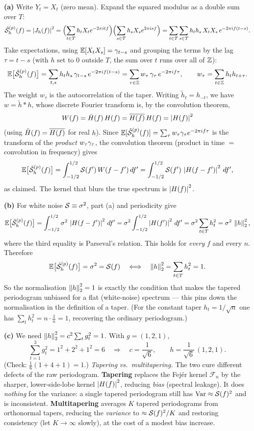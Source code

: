 \documentclass[11pt]{article}
\newcommand{\Fej}{\mathcal{F}}
\begin{document}
\textbf{(a)} Write $Y_t=X_t$ (zero mean). Expand the squared modulus as a double sum over $T$:
\[
\hat{\mathcal{S}}^{(p)}_h(f)=\left\lvert J_h(f) \right\rvert^2
=\Bigl(\sum_{t\in T}h_tX_t e^{-2\pi itf}\Bigr)\Bigl(\sum_{s\in T}h_sX_s e^{2\pi isf}\Bigr)
=\sum_{t\in T}\sum_{s\in T}h_th_s\,X_tX_s\,e^{-2\pi if(t-s)} .
\]
Take expectations, using $\mathbb{E}[X_tX_s]=\gamma_{t-s}$ and grouping the terms by the lag $\tau=t-s$ (with $h$ set to $0$ outside $T$, the sum over $t$ runs over all of $\mathbb{Z}$):
\[
\mathbb{E}\bigl[\hat{\mathcal{S}}^{(p)}_h(f)\bigr]
=\sum_{t,s}h_th_s\,\gamma_{t-s}\,e^{-2\pi if(t-s)}
=\sum_{\tau\in\mathbb{Z}} w_\tau\,\gamma_\tau\,e^{-2\pi if\tau},
\qquad
w_\tau=\sum_{t\in\mathbb{Z}}h_t h_{t+\tau} .
\]
The weight $w_\tau$ is the autocorrelation of the taper. Writing $\tilde h_t=h_{-t}$, we have $w=\tilde h * h$, whose discrete Fourier transform is, by the convolution theorem,
\[
W(f)=\tilde H(f)\,H(f)=\overline{H(f)}\,H(f)=\left\lvert H(f) \right\rvert^2
\]
(using $\tilde H(f)=\overline{H(f)}$ for real $h$). Since $\mathbb{E}[\hat{\mathcal{S}}^{(p)}_h(f)]=\sum_\tau w_\tau\gamma_\tau e^{-2\pi if\tau}$ is the transform of the \emph{product} $w_\tau\gamma_\tau$, the convolution theorem (product in time $=$ convolution in frequency) gives
\[
\mathbb{E}\bigl[\hat{\mathcal{S}}^{(p)}_h(f)\bigr]
=\int_{-1/2}^{1/2}\mathcal{S}(f')\,W(f-f')\,df'
=\int_{-1/2}^{1/2}\mathcal{S}(f')\,\left\lvert H(f-f') \right\rvert^2\,df' ,
\]
as claimed. The kernel that blurs the true spectrum is $\left\lvert H(f) \right\rvert^2$.

\textbf{(b)} For white noise $\mathcal{S}\equiv\sigma^2$, part (a) and periodicity give
\[
\mathbb{E}\bigl[\hat{\mathcal{S}}^{(p)}_h(f)\bigr]
=\int_{-1/2}^{1/2}\sigma^2\,\left\lvert H(f-f') \right\rvert^2\,df'
=\sigma^2\int_{-1/2}^{1/2}\left\lvert H(f') \right\rvert^2\,df'
=\sigma^2\sum_{t\in T}h_t^2=\sigma^2\,\left\lVert h \right\rVert_2^2 ,
\]
where the third equality is Parseval's relation. This holds for \emph{every} $f$ and every $n$. Therefore
\[
\mathbb{E}\bigl[\hat{\mathcal{S}}^{(p)}_h(f)\bigr]=\sigma^2=\mathcal{S}(f)
\quad\Longleftrightarrow\quad
\left\lVert h \right\rVert_2^2=\sum_{t\in T}h_t^2=1 .
\]
So the normalisation $\left\lVert h \right\rVert_2^2=1$ is exactly the condition that makes the tapered periodogram unbiased for a flat (white-noise) spectrum --- this pins down the normalisation in the definition of a taper. (For the constant taper $h_t=1/\sqrt n$ one has $\sum_t h_t^2=n\cdot\tfrac1n=1$, recovering the ordinary periodogram.)

\textbf{(c)} We need $\left\lVert h \right\rVert_2^2=c^2\sum_t g_t^2=1$. With $g=(1,2,1)$,
\[
\sum_{t=1}^{3}g_t^2=1^2+2^2+1^2=6
\quad\Longrightarrow\quad
c=\frac{1}{\sqrt6},\qquad
h=\frac{1}{\sqrt6}\,(1,2,1) .
\]
(Check: $\tfrac16(1+4+1)=1$.) \emph{Tapering vs.\ multitapering.} The two cure different defects of the raw periodogram. \textbf{Tapering} replaces the Fej\'er kernel $\Fej_n$ by the sharper, lower-side-lobe kernel $\left\lvert H(f) \right\rvert^2$, reducing \emph{bias} (spectral leakage). It does \emph{nothing} for the variance: a single tapered periodogram still has $\operatorname{Var}\approx\mathcal{S}(f)^2$ and is inconsistent. \textbf{Multitapering} averages $K$ tapered periodograms from orthonormal tapers, reducing the \emph{variance} to $\approx\mathcal{S}(f)^2/K$ and restoring consistency (let $K\to\infty$ slowly), at the cost of a modest bias increase.
\end{document}
